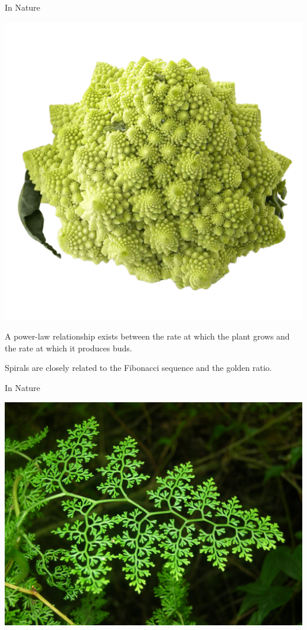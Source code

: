 \documentclass[usenames, dvipsnames, aspectratio=169]{beamer}
\begin{document}
\begin{frame}[t, c]{In Nature}{}
  \vfill
  \large
  \begin{minipage}{.48\textwidth}
    \centering
    \includegraphics[width=\textwidth]{romanesco}
  \end{minipage}%
  \hfill
  \begin{minipage}{.48\textwidth}
    \begin{overprint}
      A power-law relationship exists between the rate at which the plant grows and the rate at which it produces buds.

      Spirals are closely related to the Fibonacci sequence and the golden ratio.

    \end{overprint}
  \end{minipage}

  \vfill
\end{frame}

\begin{frame}[t, c]{In Nature}{}
  \vfill

  \centering
  \includegraphics[width=.5\textwidth]{fougere}

  \vfill
\end{frame}
\end{document}
